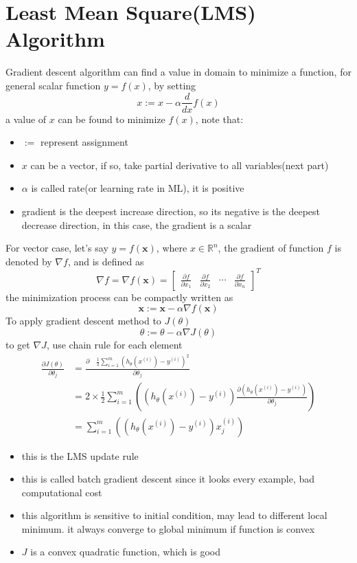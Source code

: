 \documentclass[10pt,a4paper,oneside]{article}
\begin{document}
\section{Least Mean Square(LMS) Algorithm}
Gradient descent algorithm can find a value in domain to minimize a function, for general scalar function $y = f(x)$, by setting
\[
x := x - \alpha \frac{d}{dx}f(x)
\]
a value of $x$ can be found to minimize $f(x)$, note that:
\begin{itemize}
	\item $:=$ represent assignment
	\item $x$ can be a vector, if so, take partial derivative to all variables(next part)
	\item $\alpha$ is called rate(or learning rate in ML), it is positive
	\item gradient is the deepest increase direction, so its negative is the deepest decrease direction, in this case, the gradient is a scalar
\end{itemize}
For vector case, let's say $y = f(\textbf{x})$, where $x \in \mathbb{R}^n$, the gradient of function $f$ is denoted by $\nabla f$, and is defined as
\[
\nabla f = \nabla f(\textbf{x}) = \begin{bmatrix}
\frac{\partial f}{\partial x_1} & \frac{\partial f}{\partial x_2} & \cdots &  \frac{\partial f}{\partial x_n}
\end{bmatrix}^T
\]
the minimization process can be compactly written as
\[
\textbf{x} := \textbf{x} - \alpha \nabla f(\textbf{x})
\]
To apply gradient descent method to $J(\theta)$
\[
\theta := \theta - \alpha \nabla J(\theta)
\]
to get $\nabla J$, use chain rule for each element
\begin{align*}
\frac{\partial J(\theta)}{\partial \theta_j} &= \frac{\partial \quad  \frac{1}{2} \sum_{i=1}^{m} (h_\theta(x^{(i)}) - y^{(i)})^2}{\partial \theta_j}\\
&= 2 \times \frac{1}{2}  \sum_{i=1}^{m} \left((h_\theta(x^{(i)}) - y^{(i)}) \frac{\partial (h_\theta(x^{(i)}) - y^{(i)})}{\partial \theta_j}  \right)\\
&= \sum_{i=1}^{m} \left((h_\theta(x^{(i)}) - y^{(i)}) x_j^{(i)}  \right)
\end{align*}
\begin{itemize}
	\item this is the LMS update rule
	\item this is called batch gradient descent since it looks every example, bad computational cost
	\item this algorithm is sensitive to initial condition, may lead to different local minimum. it always converge to global minimum if function is convex
	\item $J$ is a convex quadratic function, which is good
\end{itemize}
\end{document}
